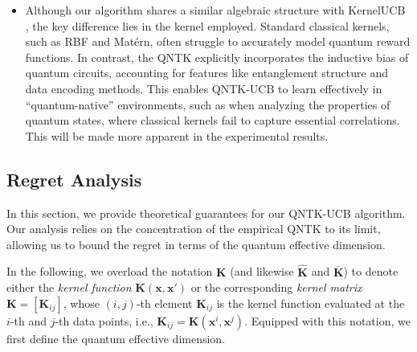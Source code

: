 \documentclass[pdflatex,sn-mathphys-num]{sn-jnl}%
\theoremstyle{thmstyleone}%
\theoremstyle{thmstyletwo}%
\theoremstyle{thmstylethree}%
\newcommand{\xbf}{\mathbf{x}}
\newcommand{\Kbf}{\mathbf{K}}
\begin{document}
\begin{itemize}
    \item Although our algorithm shares a similar algebraic structure with KernelUCB \cite{kernelucb}, the key difference lies in the kernel employed. Standard classical kernels, such as RBF and Matérn, often struggle to accurately model quantum reward functions. In contrast, the QNTK  explicitly incorporates the inductive bias of quantum circuits, accounting for features like entanglement structure and data encoding methods. This enables QNTK-UCB to learn effectively in ``quantum-native'' environments, such as when analyzing the properties of quantum states, where classical kernels fail to capture essential correlations. This will be made more apparent in the experimental results. %

\end{itemize} 












\subsection{Regret Analysis} \label{sec:reg_analysis}


In this section, we provide   theoretical guarantees for our QNTK-UCB algorithm. Our analysis relies on the concentration of the empirical QNTK to its limit, allowing us to bound the regret in terms of the quantum effective dimension. 

In the following, we overload the notation $\Kbf$ (and likewise $\hat{\Kbf}$ and $\bar{\Kbf}$) to denote either the {\em kernel function} $\Kbf(\xbf,\xbf')$ or the corresponding  {\em kernel matrix} $\Kbf = [\Kbf_{ij}]$, whose $(i,j)$-th element $\Kbf_{ij}$ is the kernel function evaluated at the $i$-th and $j$-th data points, i.e.,  $\Kbf_{ij} =\Kbf(\xbf^i, \xbf^j)$. Equipped with this notation, we first define the quantum effective dimension.
\end{document}
